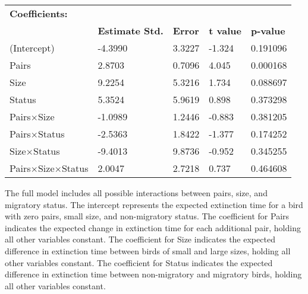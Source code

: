 \documentclass[a4paper, 12pt]{article}
\begin{document}
\begin{spacing}{1.5}
\begin{table}[h]
\begin{tabular}{lllll}
\hline
\textbf{Coefficients:}          & \textbf{}              & \textbf{}      & \textbf{}        & \textbf{}           \\
\textbf{}                       & \textbf{Estimate Std.} & \textbf{Error} & \textbf{t value} & \textbf{p-value} \\ \hline
(Intercept)                     & -4.3990                & 3.3227         & -1.324           & 0.191096            \\
Pairs                           & 2.8703                 & 0.7096         & 4.045            & 0.000168            \\
Size                            & 9.2254                 & 5.3216         & 1.734            & 0.088697            \\
Status                          & 5.3524                 & 5.9619         & 0.898            & 0.373298            \\
Pairs$\times$Size               & -1.0989                & 1.2446         & -0.883           & 0.381205            \\
Pairs$\times$Status             & -2.5363                & 1.8422         & -1.377           & 0.174252            \\
Size$\times$Status              & -9.4013                & 9.8736         & -0.952           & 0.345255            \\
Pairs$\times$Size$\times$Status & 2.0047                 & 2.7218         & 0.737            & 0.464608            \\ \hline
\end{tabular}
\begin{center}
\vspace{1mm}
\end{center}
\end{table}

The full model includes all possible interactions between pairs, size, and migratory status. The intercept represents the expected extinction time for a bird with zero pairs, small size, and non-migratory status. The coefficient for Pairs indicates the expected change in extinction time for each additional pair, holding all other variables constant. The coefficient for Size indicates the expected difference in extinction time between birds of small and large sizes, holding all other variables constant. The coefficient for Status indicates the expected difference in extinction time between non-migratory and migratory birds, holding all other variables constant.  


\end{spacing}
\end{document}

